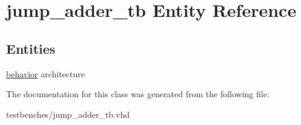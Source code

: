 \hypertarget{classjump__adder__tb}{\section{jump\-\_\-adder\-\_\-tb \-Entity \-Reference}
\label{classjump__adder__tb}
}
\subsection*{\-Entities}
\begin{DoxyCompactItemize}
\item 
\hyperlink{classjump__adder__tb_1_1behavior}{behavior} architecture
\end{DoxyCompactItemize}


\-The documentation for this class was generated from the following file\-:\begin{DoxyCompactItemize}
\item 
testbenches/jump\-\_\-adder\-\_\-tb.\-vhd\end{DoxyCompactItemize}
